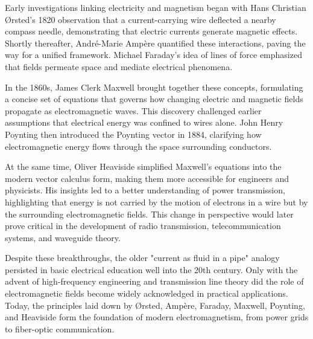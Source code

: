 \begin{historical}  
Early investigations linking electricity and magnetism began with Hans Christian Ørsted’s 1820 observation that a current-carrying wire deflected a nearby compass needle, demonstrating that electric currents generate magnetic effects. Shortly thereafter, André-Marie Ampère quantified these interactions, paving the way for a unified framework. Michael Faraday’s idea of lines of force emphasized that fields permeate space and mediate electrical phenomena.  

In the 1860s, James Clerk Maxwell brought together these concepts, formulating a concise set of equations that governs how changing electric and magnetic fields propagate as electromagnetic waves. This discovery challenged earlier assumptions that electrical energy was confined to wires alone. John Henry Poynting then introduced the Poynting vector in 1884, clarifying how electromagnetic energy flows through the space surrounding conductors.  

At the same time, Oliver Heaviside simplified Maxwell’s equations into the modern vector calculus form, making them more accessible for engineers and physicists. His insights led to a better understanding of power transmission, highlighting that energy is not carried by the motion of electrons in a wire but by the surrounding electromagnetic fields. This change in perspective would later prove critical in the development of radio transmission, telecommunication systems, and waveguide theory.  

Despite these breakthroughs, the older "current as fluid in a pipe" analogy persisted in basic electrical education well into the 20th century. Only with the advent of high-frequency engineering and transmission line theory did the role of electromagnetic fields become widely acknowledged in practical applications. Today, the principles laid down by Ørsted, Ampère, Faraday, Maxwell, Poynting, and Heaviside form the foundation of modern electromagnetism, from power grids to fiber-optic communication.  
\end{historical}